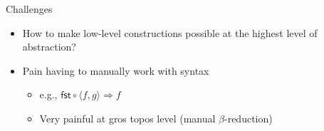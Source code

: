 \documentclass[14pt]{beamer}
\begin{document}
\begin{frame}{Challenges}
\begin{itemize}
\item How to make low-level constructions possible at the highest level of abstraction?
\item Pain having to manually work with syntax
\begin{itemize}
\item e.g., $\mathsf{fst} \circ \langle f , g \rangle \Longrightarrow f$
\item Very painful at gros topos level (manual $\beta$-reduction)
\end{itemize}
\end{itemize}
\end{frame}
\end{document}
